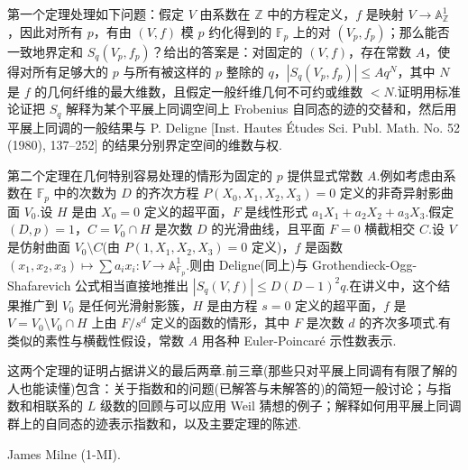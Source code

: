 第一个定理处理如下问题：假定 $V$ 由系数在 $\mathbb{Z}$ 中的方程定义，$f$ 是映射 $V \to \mathbb{A}^{1}_{\mathbb{Z}}$，因此对所有 $p$，有由 $(V, f)$ 模 $p$ 约化得到的 $\mathbb{F}_p$ 上的对 $(V_p, f_p)$；那么能否一致地界定和 $S_q(V_p, f_p)$？给出的答案是：对固定的 $(V, f)$，存在常数 $A$，使得对所有足够大的 $p$ 与所有被这样的 $p$ 整除的 $q$，$|S_q(V_p, f_p)| \leq Aq^{N}$，其中 $N$ 是 $f$ 的几何纤维的最大维数，且假定一般纤维几何不可约或维数 $< N$.证明用标准论证把 $S_q$ 解释为某个平展上同调空间上 Frobenius 自同态的迹的交替和，然后用平展上同调的一般结果与 P. Deligne [Inst. Hautes \'Etudes Sci. Publ. Math. No. 52 (1980), 137--252] 的结果分别界定空间的维数与权.

第二个定理在几何特别容易处理的情形为固定的 $p$ 提供显式常数 $A$.例如考虑由系数在 $\mathbb{F}_p$ 中的次数为 $D$ 的齐次方程 $P(X_0, X_1, X_2, X_3) = 0$ 定义的非奇异射影曲面 $V_0$.设 $H$ 是由 $X_0 = 0$ 定义的超平面，$F$ 是线性形式 $a_1 X_1 + a_2 X_2 + a_3 X_3$.假定 $(D, p) = 1$，$C = V_0 \cap H$ 是次数 $D$ 的光滑曲线，且平面 $F = 0$ 横截相交 $C$.设 $V$ 是仿射曲面 $V_0 \setminus C$(由 $P(1, X_1, X_2, X_3) = 0$ 定义)，$f$ 是函数 $(x_1, x_2, x_3) \mapsto \sum a_i x_i \colon V \to \mathbb{A}^{1}_{\mathbb{F}_p}$.则由 Deligne(同上)与 Grothendieck-Ogg-Shafarevich 公式相当直接地推出 $|S_q(V, f)| \leq D(D-1)^{2}q$.在讲义中，这个结果推广到 $V_0$ 是任何光滑射影簇，$H$ 是由方程 $s = 0$ 定义的超平面，$f$ 是 $V = V_0 \setminus V_0 \cap H$ 上由 $F/s^{d}$ 定义的函数的情形，其中 $F$ 是次数 $d$ 的齐次多项式.有类似的素性与横截性假设，常数 $A$ 用各种 Euler-Poincar\'e 示性数表示.

这两个定理的证明占据讲义的最后两章.前三章(那些只对平展上同调有有限了解的人也能读懂)包含：关于指数和的问题(已解答与未解答的)的简短一般讨论；与指数和相联系的 $L$ 级数的回顾与可以应用 Weil 猜想的例子；解释如何用平展上同调群上的自同态的迹表示指数和，以及主要定理的陈述.

James Milne (1-MI).
